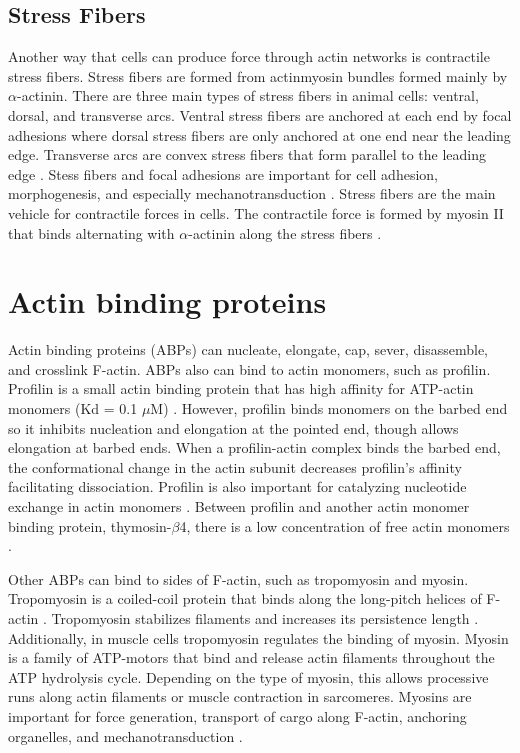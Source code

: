 \subsection{Stress Fibers}\label{stressfibers-intro}
Another way that cells can produce force through actin networks is contractile stress fibers. Stress fibers are formed from actinmyosin bundles formed mainly by $\alpha$-actinin. There are three main types of stress fibers in animal cells: ventral, dorsal, and transverse arcs. Ventral stress fibers are anchored at each end by focal adhesions where dorsal stress fibers are only anchored at one end near the leading edge. Transverse arcs are convex stress fibers that form parallel to the leading edge \citep{burridge_focal_2016}. Stess fibers and focal adhesions are important for cell adhesion, morphogenesis, and especially mechanotransduction \citep{tojkander_actin_2012}. Stress fibers are the main vehicle for contractile forces in cells. The contractile force is formed by myosin II that binds alternating with $\alpha$-actinin along the stress fibers \citep{naumanen_mechanisms_2008}. 

\section{Actin binding proteins}\label{abps} 
Actin binding proteins (ABPs) can nucleate, elongate, cap, sever, disassemble, and crosslink F-actin. ABPs also can bind to actin monomers, such as profilin. Profilin is a small actin binding protein that has high affinity for ATP-actin monomers (Kd = 0.1 $\mu$M) \citep{pollard_actin_2016}. However, profilin binds monomers on the barbed end so it inhibits nucleation and elongation at the pointed end, though allows elongation at barbed ends. When a profilin-actin complex binds the barbed end, the conformational change in the actin subunit decreases profilin's affinity facilitating dissociation. Profilin is also important for catalyzing nucleotide exchange in actin monomers \citep{mockrin_acanthamoeba_1980, vinson_interactions_1998}. Between profilin and another actin monomer binding protein, thymosin-$\beta$4, there is a low concentration of free actin monomers \citep{pollard_actin_2016}.

Other ABPs can bind to sides of F-actin, such as tropomyosin and myosin. Tropomyosin is a coiled-coil protein that binds along the long-pitch helices of F-actin \citep{ecken_structure_2015}. Tropomyosin stabilizes filaments and increases its persistence length \citep{sousa_electron_2010}. Additionally, in muscle cells tropomyosin regulates the binding of myosin. Myosin is a family of ATP-motors that bind and release actin filaments throughout the ATP hydrolysis cycle. Depending on the type of myosin, this allows processive runs along actin filaments or muscle contraction in sarcomeres. Myosins are important for force generation, transport of cargo along F-actin, anchoring organelles, and mechanotransduction \citep{hartman_myosin_2012}.

